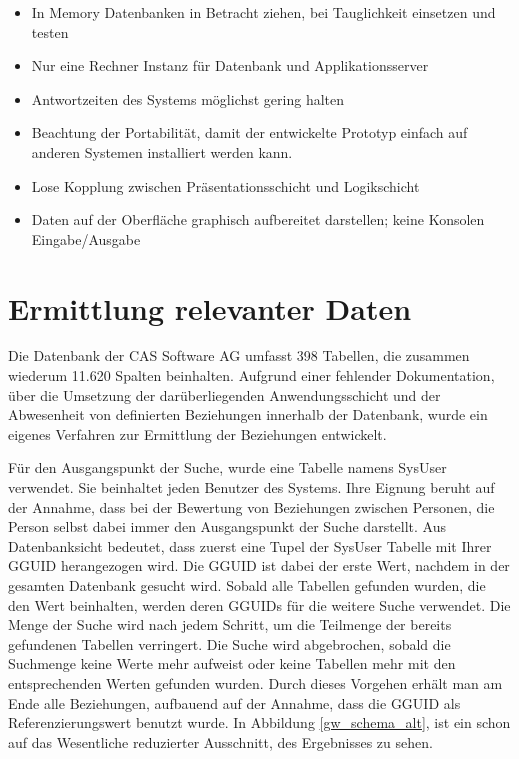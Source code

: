\begin{itemize}

	\item In Memory Datenbanken in Betracht ziehen, bei Tauglichkeit einsetzen und testen
	
	\item Nur eine Rechner Instanz für Datenbank und Applikationsserver 
	
	\item Antwortzeiten des Systems möglichst gering halten
	
	\item Beachtung der Portabilität, damit der entwickelte Prototyp einfach auf anderen Systemen installiert werden kann.
	
	\item Lose Kopplung zwischen Präsentationsschicht und Logikschicht
	
	\item Daten auf der Oberfläche graphisch aufbereitet darstellen; keine Konsolen Eingabe/Ausgabe

\end{itemize}

\section{Ermittlung relevanter Daten}
\label{ch:Systemanalyse:sec:Information}

Die Datenbank der CAS Software AG umfasst 398 Tabellen, die zusammen wiederum 11.620 Spalten beinhalten. Aufgrund einer fehlender Dokumentation, über die Umsetzung der darüberliegenden Anwendungsschicht und der Abwesenheit von definierten Beziehungen innerhalb der Datenbank, wurde ein eigenes Verfahren zur Ermittlung der Beziehungen entwickelt. 

Für den Ausgangspunkt der Suche, wurde eine Tabelle namens SysUser verwendet. Sie beinhaltet jeden Benutzer des Systems. Ihre Eignung beruht auf der Annahme, dass bei der Bewertung von Beziehungen zwischen Personen, die Person selbst dabei immer den Ausgangspunkt der Suche darstellt. Aus Datenbanksicht bedeutet, dass zuerst eine Tupel der SysUser Tabelle mit Ihrer GGUID herangezogen wird. Die GGUID ist dabei der erste Wert, nachdem in der gesamten Datenbank gesucht wird. Sobald alle Tabellen gefunden wurden, die den Wert beinhalten, werden deren GGUIDs für die weitere Suche verwendet. Die Menge der Suche wird nach jedem Schritt, um die Teilmenge der bereits gefundenen Tabellen verringert. Die Suche wird abgebrochen, sobald die Suchmenge keine Werte mehr aufweist oder keine Tabellen mehr mit den entsprechenden Werten gefunden wurden. Durch dieses Vorgehen erhält man am Ende alle Beziehungen, aufbauend auf der Annahme, dass die GGUID als Referenzierungswert benutzt wurde. In Abbildung \ref{gw_schema_alt}, ist ein schon auf das Wesentliche reduzierter Ausschnitt, des Ergebnisses zu sehen. 

